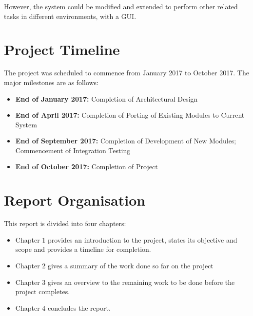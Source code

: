 However, the system could be modified and extended to perform other related tasks in different environments, with a GUI.

\section{Project Timeline}

The project was scheduled to commence from January 2017 to October 2017. The major milestones are as follows:

\begin{itemize}
    \item \textbf{End of January 2017:} Completion of Architectural Design
    \item \textbf{End of April 2017:} Completion of Porting of Existing Modules to Current System
    \item \textbf{End of September 2017:} Completion of Development of New Modules; Commencement of Integration Testing
    \item \textbf{End of October 2017:} Completion of Project
\end{itemize}

\section{Report Organisation}

This report is divided into four chapters:

\begin{itemize}
    \item Chapter 1 provides an introduction to the project, states its objective and scope and provides a timeline for completion.
    \item Chapter 2 gives a summary of the work done so far on the project
    \item Chapter 3 gives an overview to the remaining work to be done before the project completes.
    \item Chapter 4 concludes the report.
\end{itemize}